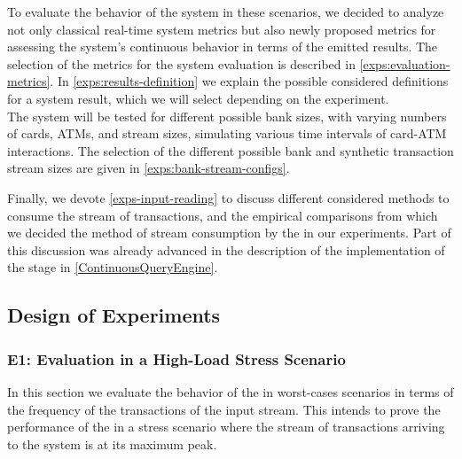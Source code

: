 To evaluate the behavior of the system in these scenarios, we decided to analyze not only classical real-time system metrics but also newly proposed metrics for assessing the system's continuous behavior in terms of the emitted results. The selection of the metrics for the system evaluation is described in \ref{exps:evaluation-metrics}. In \ref{exps:results-definition} we explain the possible considered definitions for a system result, which we will select depending on the experiment.\\

The system will be tested for different possible bank sizes, with varying numbers of cards, ATMs, and stream sizes, simulating various time intervals of card-ATM interactions. The selection of the different possible bank and synthetic transaction stream sizes are given in \ref{exps:bank-stream-configs}. 


Finally, we devote \ref{exps-input-reading} to discuss different considered methods to consume the stream of transactions, and the empirical comparisons from which we decided the method of stream consumption by the \DPATM in our experiments. Part of this discussion was already advanced in the description of the implementation of the \source \Sr stage in \ref{ContinuousQueryEngine}.

\subsection{Design of Experiments}

\subsubsection{E1: Evaluation in a High-Load Stress Scenario}
In this section we evaluate the behavior of the \DPATM in worst-cases scenarios in terms of the frequency of the transactions of the input stream. This intends to prove the performance of the \DPATM in a stress scenario where the stream of transactions arriving to the system is at its maximum peak.\\

